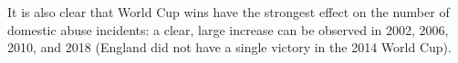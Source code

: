 \documentclass[12pt, a4paper]{article}
\begin{document}
  It is also clear that World Cup wins have the strongest effect on the number of domestic abuse incidents: a clear, large increase can be observed in 2002, 2006, 2010, and 2018 (England did not have a single victory in the 2014 World Cup).
 




\end{document}
